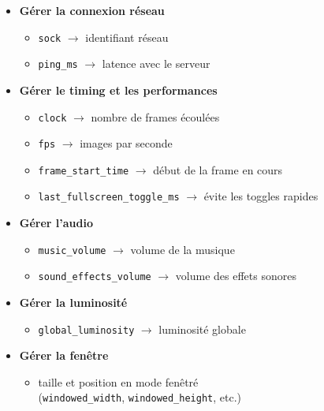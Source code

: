 \documentclass[12pt,a4paper]{article}
\begin{document}
\begin{itemize}
\begin{itemize}
                    \item \textbf{Gérer la connexion réseau}
                    \begin{itemize}
                        \item \texttt{sock} $\rightarrow$ identifiant réseau
                        \item \texttt{ping\_ms} $\rightarrow$ latence avec le serveur
                    \end{itemize}

                    \item \textbf{Gérer le timing et les performances}
                    \begin{itemize}
                        \item \texttt{clock} $\rightarrow$ nombre de frames écoulées
                        \item \texttt{fps} $\rightarrow$ images par seconde
                        \item \texttt{frame\_start\_time} $\rightarrow$ début de la frame en cours
                        \item \texttt{last\_fullscreen\_toggle\_ms} $\rightarrow$ évite les toggles rapides
                    \end{itemize}

                    \item \textbf{Gérer l’audio}
                    \begin{itemize}
                        \item \texttt{music\_volume} $\rightarrow$ volume de la musique
                        \item \texttt{sound\_effects\_volume} $\rightarrow$ volume des effets sonores
                    \end{itemize}

                    \item \textbf{Gérer la luminosité} 
                    \begin{itemize}
                        \item \texttt{global\_luminosity} $\rightarrow$ luminosité globale 
                    \end{itemize}

                    \item \textbf{Gérer la fenêtre}
                    \begin{itemize}
                        \item taille et position en mode fenêtré \\
                            (\texttt{windowed\_width}, \texttt{windowed\_height}, etc.)
                    \end{itemize}


\end{itemize}
\end{itemize}
\end{document}
